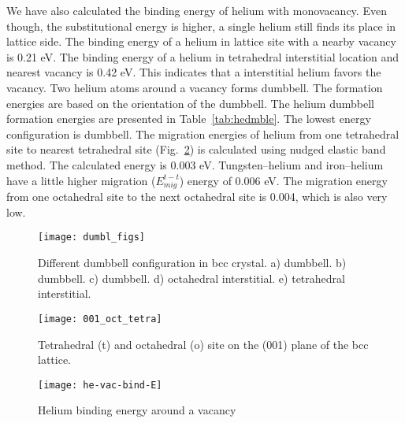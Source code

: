 We have also calculated the binding energy of helium with monovacancy. Even though, the substitutional energy is higher, a single helium still finds its place in lattice side. The binding energy of a helium in lattice site with a nearby vacancy is 0.21 eV. The binding energy of a helium in tetrahedral interstitial location and nearest vacancy is 0.42 eV. This indicates that a interstitial helium favors the vacancy. Two helium atoms around a vacancy forms dumbbell. The formation energies are based on the orientation of the dumbbell. The helium dumbbell formation energies are presented in Table~\ref{tab:hedmble}. The lowest energy configuration is  dumbbell. The migration energies of helium from one tetrahedral site to nearest tetrahedral site (Fig.~\ref{fig:001}) is calculated using nudged elastic band method. The calculated energy is 0.003 eV. Tungsten--helium and iron--helium have a little higher migration ($E_{mig}^{t-t}$) energy of 0.006 eV. The migration energy from one octahedral site to the next octahedral site is 0.004, which is also very low.



\begin{figure}
\centering
\texttt{[image: dumbl\_figs]}
\caption[Different dumbbell configuration in bcc lithium]{Different dumbbell configuration in bcc crystal. a)  dumbbell. b)  dumbbell. c)  dumbbell. d) octahedral interstitial. e) tetrahedral interstitial.}
\label{fig:dmbl}
\end{figure}

\begin{figure}
\centering
\texttt{[image: 001\_oct\_tetra]}
\caption[Interstitial atom location in 2D for bcc crystal]{Tetrahedral (t) and octahedral (o) site on the (001) plane of the bcc lattice.}
\label{fig:001}
\end{figure}

\begin{figure}
\centering
\texttt{[image: he-vac-bind-E]}
\caption[He binding energy]{Helium binding energy around a vacancy}
\label{fig:he-bind}
\end{figure}

\pagebreak
%


